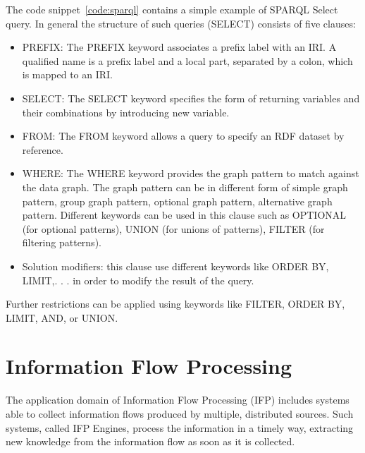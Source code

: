 The code snippet~\ref{code:sparql} contains a simple example of SPARQL Select query. In general the structure of such queries (SELECT) consists of five clauses:
\begin{itemize}
\item PREFIX: The PREFIX keyword associates a prefix label with an IRI. A qualified name is a prefix label and a local part, separated by a colon, which is mapped to an IRI.
\item SELECT: The SELECT keyword specifies the form of returning variables and their combinations by introducing new variable.
\item FROM: The FROM keyword allows a query to specify an RDF dataset by reference.
\item WHERE: The WHERE keyword provides the graph pattern to match against the data graph. The graph pattern can be in different form of simple graph pattern, group graph pattern, optional graph pattern, alternative graph pattern. Different keywords can be used in this clause such as OPTIONAL (for optional patterns), UNION (for unions of patterns), FILTER (for filtering patterns).
\item Solution modifiers: this clause use different keywords like ORDER BY, LIMIT,. . . in order to modify the result of the query.
\end{itemize}

Further restrictions can be applied using keywords like FILTER, ORDER BY, LIMIT, AND, or UNION.

\pagebreak

\section{Information Flow Processing}\label{sec:ifp}

The application domain of Information Flow Processing (IFP) includes systems able to collect information flows produced by multiple, distributed sources. Such systems, called IFP Engines, process the information in a timely way, extracting new knowledge from the information flow as soon as it is collected.

